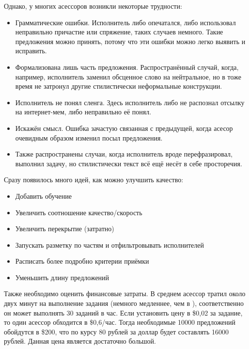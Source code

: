 Однако, у многих асессоров возникли некоторые трудности:
\begin{itemize}
    \item Грамматические ошибки. Исполнитель либо опечатался, либо использовал неправильно причастие или спряжение, таких случаев немного. Такие предложения можно принять, потому что эти ошибки можно легко выявить и исправить.

    \item Формализована лишь часть предложения. Распространённый случай, когда, например, исполнитель заменил обсценное слово на нейтральное, но в тоже время не затронул другие стилистически неформальные конструкции.

    \item Исполнитель не понял сленга. Здесь исполнитель либо не распознал отсылку на интернет-мем, либо неправильно её понял.

    \item Искажён смысл. Ошибка зачастую связанная с предыдущей, когда асесор очевидным образом изменил посыл предложения.

    \item Также распространены случаи, когда исполнитель вроде перефразировал, выполнил задачу, но стилистически текст всё ещё несёт в себе просторечия.
\end{itemize}

Сразу появилось много идей, как можно улучшить качество:
\begin{itemize}
    \item Добавить обучение
    \item Увеличить соотношение качество/скорость
    \item Увеличить перекрытие (затратно)
    \item Запускать разметку по частям и отфильтровывать исполнителей
    \item Расписать более подробно критерии приёмки
    \item Уменьшить длину предложений
\end{itemize}

Также необходимо оценить финансовые затраты.
В среднем асессор тратил около двух минут на выполнение задания (немного медленнее, чем в \cite{dementieva2021crowdsourcing}), соответственно он может выполнять 30 заданий в час.
Если установить цену в \$0,02 за задание, то один асессор обходится в \$0,6/час.
Тогда необходимые 10000 предложений обойдутся в \$200, что по курсу 80 рублей за доллар будет составлять 16000 рублей.
Данная цена является достаточно большой.

